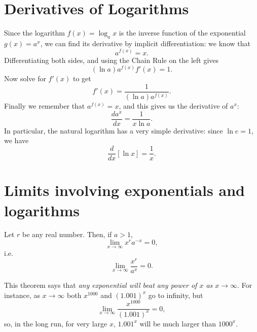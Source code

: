 \section{Derivatives of Logarithms} %
Since the logarithm $f(x)=\log_a x$ is the inverse function of the exponential
$g(x) = a^x$, we can find its derivative by implicit differentiation: we know
that
\[
a^{f(x)} = x.
\]
Differentiating both sides, and using the Chain Rule on the left gives
\[
(\ln a)  a^{f(x)} f'(x) = 1.
\]
Now solve for $f'(x)$ to get
\[
f'(x) = \frac{1}{(\ln a) a^{f(x)}}.
\]
Finally we remember that $a^{f(x)} = x$, and this gives us the derivative of $a^x$:
\[
\frac{da^x}{dx} = \frac{1}{x\ln a}.
\]
In particular, the natural logarithm has a very simple derivative: since $\ln
e=1$, we have
\begin{equation}\label{eq:derivative-of-ln}
 \frac{d}{dx}\left[\ln x\right] = \frac{1}{x}.
\end{equation}


\section{Limits involving exponentials and logarithms} %
\begin{theorem}  Let $r$ be any real number.  Then, if $a>1$,
  \[
  \lim_{x\to\infty} x^r a^{-x} = 0,
  \]
  i.e.
  \[
  \lim_{x \to\infty}\frac{x^r}{a^x} = 0.
  \]
\end{theorem}
This theorem says that \textit{any exponential will beat any power of $x$ as
  $x\to\infty$}.  For instance, as $x \to\infty$ both $x^{1000}$ and $(1.001)^x$
go to infinity, but
\[
\lim_{x \to\infty} \frac{x^{1000}}{(1.001)^x} = 0,
\]
so, in the long run, for very large $x$, $1.001^x$ will be much larger than
$1000^x$.



%

